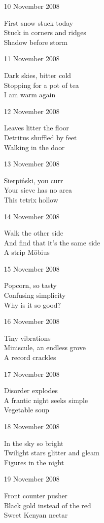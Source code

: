 \documentclass[12pt]{article}
\begin{document}
\newpage

10 November 2008

First snow stuck today \\
Stuck in corners and ridges \\
Shadow before storm

11 November 2008

Dark skies, bitter cold \\
Stopping for a pot of tea \\
I am warm again

12 November 2008

Leaves litter the floor \\
Detritus shuffled by feet \\
Walking in the door

13 November 2008

Sierpi\'{n}ski, you curr \\
Your sieve has no area \\
This tetrix hollow

14 November 2008

Walk the other side \\
And find that it's the same side \\
A strip M\"{o}bius

15 November 2008

Popcorn, so tasty \\
Confusing simplicity \\
Why is it so good?

16 November 2008

Tiny vibrations \\
Miniscule, an endless grove \\
A record crackles

\newpage

17 November 2008

Disorder explodes \\
A frantic night seeks simple \\
Vegetable soup

18 November 2008

In the sky so bright \\
Twilight stars glitter and gleam \\
Figures in the night

19 November 2008

Front counter pusher \\
Black gold instead of the red \\
Sweet Kenyan nectar
\end{document}
